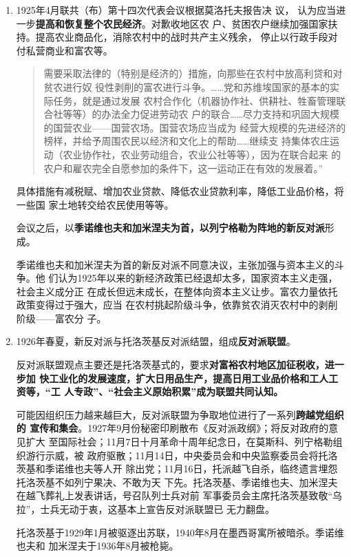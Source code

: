 \begin{enumerate}
\item 1925年4月联共（布）第十四次代表会议根据莫洛托夫报告决
  议\cite[538-550]{jueyi2}， 认为应当进一步\textbf{提高和恢复整个农民经济}。对歉收地区农
  户、贫困农户继续加强国家扶持。提高农业商品化，消除农村中的战时共产主义残余，
  停止以行政手段对付私营商业和富农等。
  \begin{quotation}
    需要采取法律的（特别是经济的）措施，向那些在农村中放高利贷和对贫农进行奴
    役性剥削的富农进行斗争。……党和苏维埃国家的基本的实际任务，就是通过发展
    农村合作化（机器协作社、供耕社、牲畜管理联合社等等）的办法全力促进劳动农
    户的联合……尽力支持和巩固大规模的国营农业——国营农场。国营农场应当成为
    经营大规模的先进经济的榜样，并给予周围农民以经济和文化上的帮助……继续支
    持集体农庄运动（农业协作社，农业劳动组合，农业公社等等），因为在联合起来
    的农户和雇农完全自愿参加的条件下，这一运动正在有效的发展着。”
  \end{quotation}
  具体措施有减税赋、增加农业贷款、降低农业贷款利率，降低工业品价格，将一些国
  家土地转交给农民使用等等。

  会议之后，以\textbf{季诺维也夫和加米涅夫为首，以列宁格勒为阵地的新反对派}形成。

  季诺维也夫和加米涅夫为首的新反对派不同意决议，主张加强与资本主义的斗争。他
  们认为1925年以来的新经济政策已经退却太多，国家资本主义走强，社会主义成分正
  在成长但远未成长，在整体向资本主义让步。富农力量依托政策变得过于强大，应当
  在农村挑起阶级斗争，依靠贫农消灭农村中的剥削阶级——富农分
  子。\cite[2.4.2节]{yanyongfeinep}

\item 1926年春夏，新反对派与托洛茨基反对派结盟，组成\textbf{反对派联盟}。

  反对派联盟观点主要还是托洛茨基式的，要求\textbf{对富裕农村地区加征税收，进一步加
    快工业化的发展速度，扩大日用品生产，提高日用工业品价格和工人工资等，“工
    人专政”、“社会主义原始积累”成为联盟共同认知。}

  可能因组织压力越来越巨大，反对派联盟为争取地位进行了一系列\textbf{跨越党组织的
    宣传和集会}。1927年9月份秘密印刷散布《反对派政纲》；将反对政府的意见扩大
  至国际社会；11月7日十月革命十周年纪念日，在莫斯科、列宁格勒组织游行示威，被
  政府驱散；11月14日，中央委员会和中央监察委员会将托洛茨基和季诺维也夫等人开
  除出党；11月16日，托派越飞自杀，临终遗言埋怨托洛茨基不如列宁果决、不敢为天
  下先。托洛茨基、季诺维也夫、加米涅夫在越飞葬礼上发表讲话，号召队列士兵对前
  军事委员会主席托洛茨基致敬“乌拉”，士兵无动于衷，这基本上宣告反对派联盟已
  无力翻盘。

  托洛茨基于1929年1月被驱逐出苏联，1940年8月在墨西哥寓所被暗杀。季诺维也夫和
  加米涅夫于1936年8月被枪毙。


\end{enumerate}
